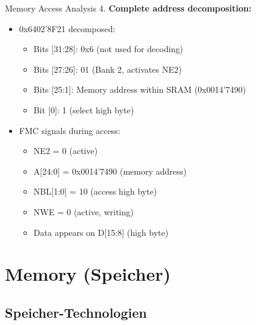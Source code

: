 \begin{example2}{Memory Access Analysis}
4. \textbf{Complete address decomposition:}
   \begin{itemize}
     \item 0x6402'8F21 decomposed:
     \begin{itemize}
       \item Bits [31:28]: 0x6 (not used for decoding)
       \item Bits [27:26]: 01 (Bank 2, activates NE2)
       \item Bits [25:1]: Memory address within SRAM (0x0014'7490)
       \item Bit [0]: 1 (select high byte)
     \end{itemize}
     \item FMC signals during access:
     \begin{itemize}
       \item NE2 = 0 (active)
       \item A[24:0] = 0x0014'7490 (memory address)
       \item NBL[1:0] = 10 (access high byte)
       \item NWE = 0 (active, writing)
       \item Data appears on D[15:8] (high byte)
     \end{itemize}
   \end{itemize}
\end{example2}

\section{Memory (Speicher)}

\subsection{Speicher-Technologien}

